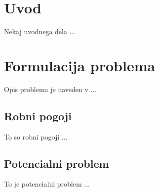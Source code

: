 \documentclass[11pt]{article}
\theoremstyle{definition}
\begin{document}
\section{Uvod}

Nekaj uvodnega dela ...

\section{Formulacija problema}

Opis problema je naveden v \cite{cfd_ferziger_peric} ...

\subsection{Robni pogoji}


To so robni pogoji ...

\subsection{Potencialni problem}

To je potencialni problem ...

\vspace{1cm}



\end{document}
